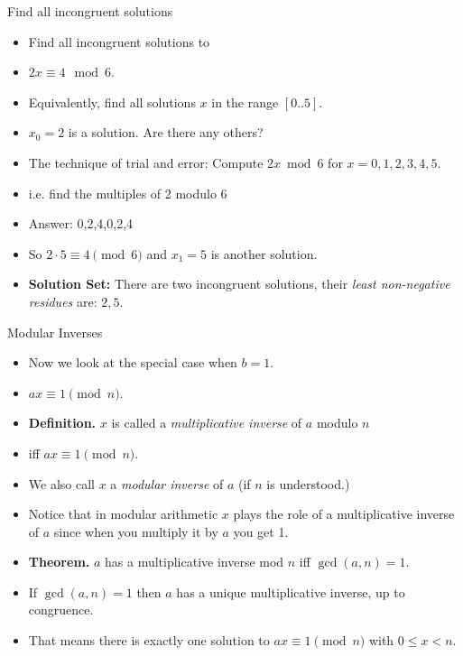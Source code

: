 \documentclass{beamer}
\begin{document}
\begin{frame}{Find all incongruent solutions}
\begin{itemize}
  \item Find all incongruent solutions to
  \item $2x  \equiv 4 \mod 6$.
  \item Equivalently, find all solutions $x$ in the range $[0..5]$.
  \item $x_0=2$ is a solution. Are there any others?
  \item The technique of trial and error: Compute $2x \bmod 6$ for $x=0,1,2,3,4,5$.
  \item i.e. find the multiples of 2 modulo 6
  \item Answer: 0,2,4,0,2,4
  \item So $2\cdot 5 \equiv 4 \pmod 6$ and $x_1=5$ is another solution.
  \item \textbf{Solution Set:} There are two incongruent solutions, their \emph{least non-negative residues} are: $2,5$.
\end{itemize}
\end{frame}

\begin{frame}{Modular Inverses}
\begin{itemize}
  \item Now we look at the special case when $b=1$.
  \item $ax\equiv 1 \pmod n$.
  \item \textbf{Definition.} $x$ is called a \emph{multiplicative inverse}  of $a$ modulo $n$
  \item iff $ax \equiv 1 \pmod n$.
  \item We also call $x$ a \emph{modular inverse} of $a$ (if $n$ is understood.)
  \item Notice that in modular arithmetic $x$ plays the role of a multiplicative inverse of $a$ since when you multiply it by $a$ you get 1.
  \item \textbf{Theorem.} $a$ has a multiplicative inverse mod $n$ iff $\gcd(a,n)=1$.
  \item If $\gcd(a,n) = 1$ then $a$ has a unique multiplicative inverse, up to congruence.
  \item That means there is exactly one solution to $ax\equiv 1 \pmod n$ with $0\leq x < n$.
\end{itemize}
\end{frame}
\end{document}
